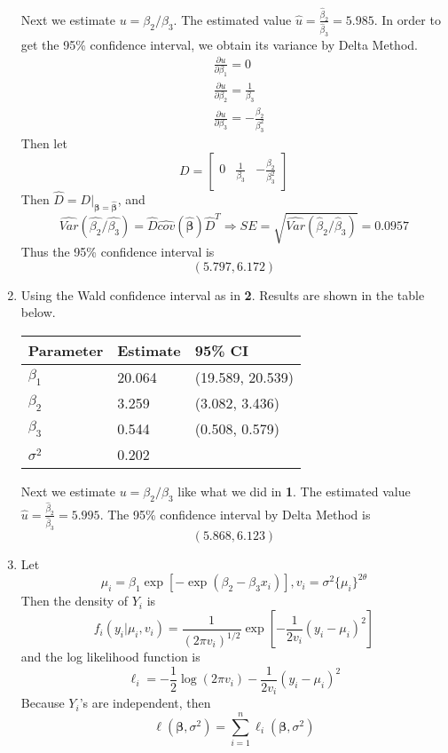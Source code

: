 \documentclass{article}
\begin{document}
\begin{enumerate}[leftmargin = 0 em, label = \arabic*., font = \bfseries]
	Next we estimate $u = \beta_2/\beta_3$. The estimated value $\hat{u} = \frac{\hat{\beta}_2}{\hat{\beta}_3} = 5.985$. In order to get the 95\% confidence interval, we obtain its variance by Delta Method. 
	\begin{align*}
	&\frac{\partial u}{\partial \beta_1} = 0\\
	&\frac{\partial u}{\partial \beta_2} = \frac{1}{\beta_3}\\
	&\frac{\partial u}{\partial \beta_3} = -\frac{\beta_2}{\beta_3^2}
	\end{align*}
	Then let
	\[D = \begin{bmatrix}
		0 & \frac{1}{\beta_3} & -\frac{\beta_2}{\beta_3^2}
	\end{bmatrix}\]
	Then $\hat{D} = D|_{\bm \beta = \hat{\bm \beta}}$, and 
	\[\widehat{Var}(\hat{\beta_2}/\hat{\beta_3}) = \hat{D} \widehat{cov}(\hat{\bm \beta})\hat{D}^T \Rightarrow SE = \sqrt{\widehat{Var}({\hat{\beta}_2 / \hat{\beta}_3})} = 0.0957\]
	Thus the 95\% confidence interval is
	\[(5.797, 6.172)\]
	

	\item 
	Using the Wald confidence interval as in \textbf{2}. Results are shown in the table below.

	\begin{center}
	\begin{tabular}{lll}
		 \toprule
		 Parameter & Estimate & 95\% CI\\
		 \midrule
		 $\beta_1$ & 20.064 & (19.589, 20.539)\\
		 $\beta_2$ & 3.259 & (3.082, 3.436)\\
		 $\beta_3$ & 0.544 & (0.508, 0.579)\\
		 $\sigma^2$ & 0.202 & \\
		 \bottomrule
		\end{tabular}
	\end{center}

	Next we estimate $u = \beta_2/\beta_3$ like what we did in \textbf{1}. The estimated value $\hat{u} = \frac{\hat{\beta}_2}{\hat{\beta}_3} = 5.995$. The 95\% confidence interval by Delta Method is
	\[(5.868, 6.123)\]

	\item 
	Let 
	\[\mu_i = \beta_1 \exp[-\exp(\beta_2 - \beta_3 x_i)], v_i = \sigma^2 \{\mu_i\}^{2 \theta}\]
	Then the density of $Y_i$ is
	\[f_i(y_i|\mu_i, v_i) = \frac{1}{(2 \pi v_i)^{1/2}} \exp\left[-\frac{1}{2v_i} (y_i - \mu_i)^2\right]\]
	and the log likelihood function is
	\[\ell_i = -\frac{1}{2} \log (2 \pi v_i) - \frac{1}{2 v_i} (y_i - \mu_i)^2\]
	Because $Y_i$'s are independent, then
	\[\ell(\bm \beta, \sigma^2) = \sum_{i=1}^n \ell_i (\bm \beta, \sigma^2)\]


\end{enumerate}
\end{document}
